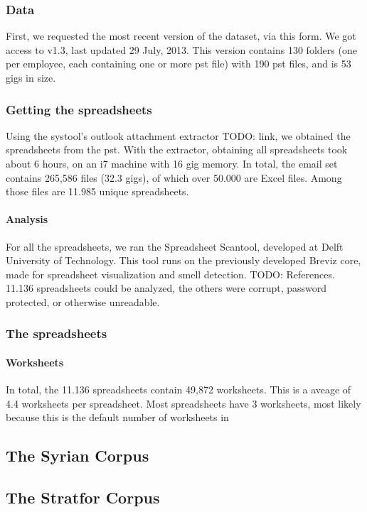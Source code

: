 \documentclass[conference]{IEEEtran}
\begin{document}
\subsubsection{Data}
First, we requested the most recent version of the dataset, via this form. We got access to v1.3, last updated 29 July, 2013. This version contains 130 folders (one per employee, each containing one or more pst file) with 190 pst files, and is 53 gigs in size.

\subsubsection{Getting the spreadsheets}
Using the systool's outlook attachment extractor TODO: link, we obtained the spreadsheets from the pst. With the extractor, obtaining all spreadsheets took about 6 hours, on an i7 machine with 16 gig memory. In total, the email set contains 265,586 files (32.3 gigs), of which over 50.000 are Excel files. Among those files are 11.985 unique spreadsheets.

\paragraph{Analysis}
For all the spreadsheets, we ran the Spreadsheet Scantool, developed at Delft University of Technology. This tool runs on the previously developed Breviz core, made for spreadsheet visualization and smell detection. TODO: References. 11.136 spreadsheets could be analyzed, the others were corrupt, password protected, or otherwise unreadable.

\subsubsection{The spreadsheets}
\paragraph{Worksheets}
In total, the 11.136 spreadsheets contain 49,872 worksheets. This is a aveage of 4.4 worksheets per spreadsheet. Most spreadsheets have 3 worksheets, most likely because this is the default number of worksheets in 

\subsection{The Syrian Corpus}

\subsection{The Stratfor Corpus}
\end{document}
